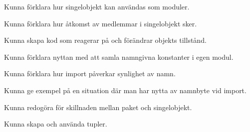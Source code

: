 
\item Kunna förklara hur singelobjekt kan användas som moduler.
\item Kunna förklara hur åtkomst av medlemmar i singelobjekt sker.
\item Kunna skapa kod som reagerar på och förändrar objekts tillstånd.
\item Kunna förklara nyttan med att samla namngivna konstanter i egen modul.
\item Kunna förklara hur import påverkar synlighet av namn.
\item Kunna ge exempel på en situation där man har nytta av namnbyte vid import.
\item Kunna redogöra för skillnaden mellan paket och singelobjekt.
\item Kunna skapa och använda tupler.
